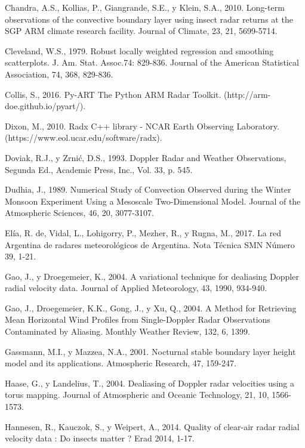 \documentclass[12pt,spanish,oneside]{book}
\begin{document}
\hypertarget{ref-Chandra2010}{}
Chandra, A.S., Kollias, P., Giangrande, S.E., y Klein, S.A., 2010.
Long-term observations of the convective boundary layer using insect
radar returns at the SGP ARM climate research facility. Journal of
Climate, 23, 21, 5699-5714.

\hypertarget{ref-Cleveland1979}{}
Cleveland, W.S., 1979. Robust locally weighted regression and smoothing
scatterplots. J. Am. Stat. Assoc.74: 829-836. Journal of the American
Statistical Association, 74, 368, 829-836.

\hypertarget{ref-Collis2016}{}
Collis, S., 2016. Py-ART The Python ARM Radar Toolkit.
(http://arm-doe.github.io/pyart/).

\hypertarget{ref-Dixon2010}{}
Dixon, M., 2010. Radx C++ library - NCAR Earth Observing Laboratory.
(https://www.eol.ucar.edu/software/radx).

\hypertarget{ref-Doviak1993}{}
Doviak, R.J., y Zrnić, D.S., 1993. Doppler Radar and Weather
Observations, Segunda Ed., Academic Press, Inc., Vol. 33, p. 545.

\hypertarget{ref-Dudhia1989}{}
Dudhia, J., 1989. Numerical Study of Convection Observed during the
Winter Monsoon Experiment Using a Mesoscale Two-Dimensional Model.
Journal of the Atmospheric Sciences, 46, 20, 3077-3107.

\hypertarget{ref-DeElia2017}{}
Elía, R. de, Vidal, L., Lohigorry, P., Mezher, R., y Rugna, M., 2017. La
red Argentina de radares meteorológicos de Argentina. Nota Técnica SMN
Número 39, 1-21.

\hypertarget{ref-Gao2004}{}
Gao, J., y Droegemeier, K., 2004. A variational technique for dealiasing
Doppler radial velocity data. Journal of Applied Meteorology, 43, 1990,
934-940.

\hypertarget{ref-Gao2004a}{}
Gao, J., Droegemeier, K.K., Gong, J., y Xu, Q., 2004. A Method for
Retrieving Mean Horizontal Wind Profiles from Single-Doppler Radar
Observations Contaminated by Aliasing. Monthly Weather Review, 132, 6,
1399.

\hypertarget{ref-Gassmann2001}{}
Gassmann, M.I., y Mazzea, N.A., 2001. Nocturnal stable boundary layer
height model and its applications. Atmospheric Research, 47, 159-247.

\hypertarget{ref-Haase2004}{}
Haase, G., y Landelius, T., 2004. Dealiasing of Doppler radar velocities
using a torus mapping. Journal of Atmospheric and Oceanic Technology,
21, 10, 1566-1573.

\hypertarget{ref-Hannesen2014}{}
Hannesen, R., Kauczok, S., y Weipert, A., 2014. Quality of clear-air
radar radial velocity data : Do insects matter ? Erad 2014, 1-17.
\end{document}
